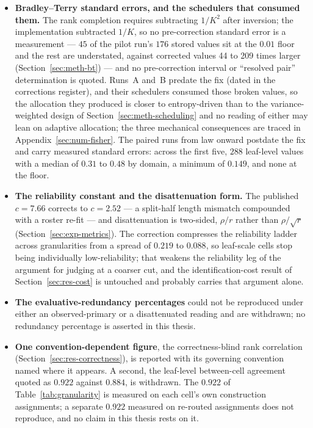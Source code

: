 \begin{itemize}

\item \textbf{Bradley--Terry standard errors, and the schedulers that
consumed them.} The rank completion requires subtracting $1/K^2$
after inversion; the implementation subtracted $1/K$, so no
pre-correction standard error is a measurement --- $45$ of the pilot
run's $176$ stored values sit at the $0.01$ floor and the rest are
understated, against corrected values 44 to 209 times larger
(Section~\ref{sec:meth-bt}) --- and no pre-correction interval or
``resolved pair'' determination is quoted. Runs~A and~B predate the
fix (dated in the corrections register), and their schedulers consumed
those broken values, so the allocation they produced is closer to
entropy-driven than to the variance-weighted design of
Section~\ref{sec:meth-scheduling} and no reading of either may lean on
adaptive allocation; the three mechanical consequences are traced in
Appendix~\ref{sec:num-fisher}. The paired runs from law onward
postdate the fix and carry measured standard errors: across the first
five, $288$ leaf-level values with a median of $0.31$ to $0.48$ by
domain, a minimum of $0.149$, and none at the floor.

\item \textbf{The reliability constant and the disattenuation form.}
The published $c = 7.66$ corrects to $c = 2.52$ --- a split-half
length mismatch compounded with a roster re-fit --- and disattenuation
is two-sided, $\rho / r$ rather than $\rho / \sqrt{r}$
(Section~\ref{sec:exp-metrics}). The correction compresses the
reliability ladder across granularities from a spread of $0.219$ to
$0.088$, so leaf-scale cells stop being individually low-reliability;
that weakens the reliability leg of the argument for judging at a
coarser cut, and the identification-cost result of
Section~\ref{sec:res-cost} is untouched and probably carries that
argument alone.

\item \textbf{The evaluative-redundancy percentages} could not be
reproduced under either an observed-primary or a disattenuated
reading and are withdrawn; no redundancy percentage is asserted in
this thesis.

\item \textbf{One convention-dependent figure}, the correctness-blind
rank correlation (Section~\ref{sec:res-correctness}), is reported with
its governing convention named where it appears. A second, the leaf-level between-cell
agreement quoted as $0.922$ against $0.884$, is withdrawn. The $0.922$
of Table~\ref{tab:granularity} is measured on each cell's own
construction assignments; a separate $0.922$ measured on re-routed
assignments does not reproduce, and no claim in this thesis rests on
it.


\end{itemize}
